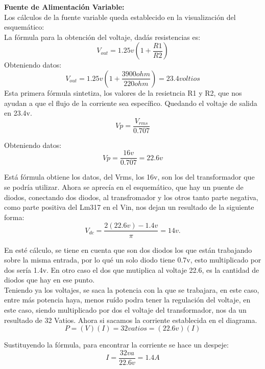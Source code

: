 \documentclass[14pt,a4paper]{article}
\begin{document}
\textbf{Fuente de Alimentación Variable:\\}
Los cálculos de la fuente variable queda establecido en la visualización del esquemático:\\
La fórmula para la obtención del voltaje, dadás resistencias es:\\
$$ V_{out}= 1.25v(1+\frac{R1}{R2}) $$
Obteniendo datos:\\
$$ V_{out}= 1.25v(1+\frac{3900 ohm}{220 ohm})=23.4 voltios $$
Esta primera fórmula sintetiza, los valores de la resietncia R1 y R2, que nos ayudan a que el flujo de la corriente sea específico. Quedando el voltaje de salida en 23.4v.\\

$$ Vp= \frac{V_{rms}}{0.707} $$

Obteniendo datos:\\

$$ Vp=\frac{16v}{0.707}= 22.6 v $$

Está fórmula obtiene los datos, del Vrms, los 16v, son los del transformador que se podría utilizar. Ahora se aprecía en el esquemático, que hay un puente de diodos, conectando dos diodos, al transfromador y los otros tanto parte negativa, como parte positiva del Lm317 en el Vin, nos dejan un resultado de la siguiente forma:\\

$$ V_{dc}=\frac{2(22.6v)-1.4v}{\pi}= 14 v. $$

En esté cálculo, se tiene en cuenta que son dos diodos los que están trabajando sobre la misma entrada, por lo qué un solo diodo tiene 0.7v, esto multiplicado por dos sería 1.4v. En otro caso el dos que mutiplica al voltaje 22.6, es la cantidad de diodos que hay en ese punto.\\
Teniendo ya los voltajes, se saca la potencia con la que se trabajara, en este caso, entre más potencia haya, menos ruído podra tener la regulación del voltaje, en este caso, siendo multiplicado por dos el voltaje del transformador, nos da un resultado de 32 Vatios. Ahora si sacamos la corriente establecida en el diagrama.\\

$$ P= (V)(I)= 32vatios=(22.6v)(I) $$

Sustituyendo la fórmula, para encontrar la corriente se hace un despeje:\\

$$ I= \frac{32va}{22.6v}= 1.4 A $$
\end{document}
